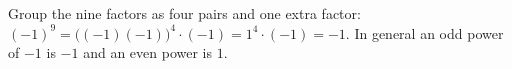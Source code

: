 Group the nine factors as four pairs and one extra factor: $(-1)^9=\bigl((-1)(-1)\bigr)^4\cdot(-1)=1^4\cdot(-1)=\boxed{-1}$. In general an odd power of $-1$ is $-1$ and an even power is $1$.
